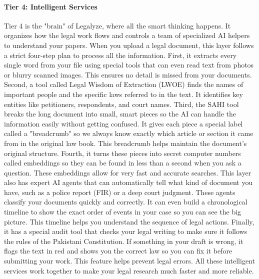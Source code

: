 \documentclass[a4paper,fleqn]{cas-dc}
\begin{document}
\paragraph{\textbf{Tier 4: Intelligent Services}}
Tier 4 is the "brain" of Legalyze, where all the smart thinking happens. It organizes how the legal work flows and controls a team of specialized AI helpers to understand your papers. When you upload a legal document, this layer follows a strict four-step plan to process all the information. First, it extracts every single word from your file using special tools that can even read text from photos or blurry scanned images. This ensures no detail is missed from your documents. Second, a tool called Legal Wisdom of Extraction (LWOE) finds the names of important people and the specific laws referred to in the text. It identifies key entities like petitioners, respondents, and court names. Third, the SAHI tool breaks the long document into small, smart pieces so the AI can handle the information easily without getting confused. It gives each piece a special label called a "breadcrumb" so we always know exactly which article or section it came from in the original law book. This breadcrumb helps maintain the document's original structure. Fourth, it turns these pieces into secret computer numbers called embeddings so they can be found in less than a second when you ask a question. These embeddings allow for very fast and accurate searches. This layer also has expert AI agents that can automatically tell what kind of document you have, such as a police report (FIR) or a deep court judgment. These agents classify your documents quickly and correctly. It can even build a chronological timeline to show the exact order of events in your case so you can see the big picture. This timeline helps you understand the sequence of legal actions. Finally, it has a special audit tool that checks your legal writing to make sure it follows the rules of the Pakistani Constitution. If something in your draft is wrong, it flags the text in red and shows you the correct law so you can fix it before submitting your work. This feature helps prevent legal errors. All these intelligent services work together to make your legal research much faster and more reliable.
\end{document}
